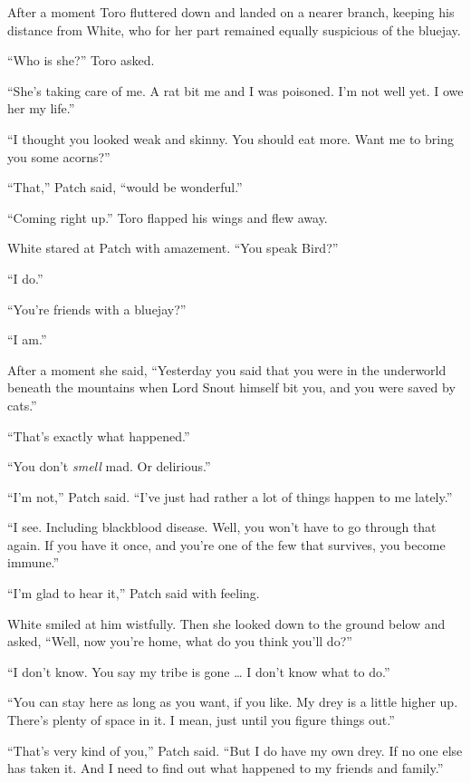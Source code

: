 \documentclass[ebook,oneside,openany,17pt]{memoir}
\newenvironment{tolerant}[1]{%
  \par\tolerance=#1\relax
}{%
  \par
}
\begin{document}
After a moment Toro fluttered down and landed on a nearer branch,
keeping his distance from White, who for her part remained equally
suspicious of the bluejay.

“Who is she?” Toro asked.

“She’s taking care of me. A rat bit me and I was poisoned. I’m not
well yet. I owe her my life.”

\begin{tolerant}{1000}
“I thought you looked weak and skinny. You should eat more. Want me to
bring you some acorns?”
\end{tolerant}

“That,” Patch said, “would be wonderful.”

“Coming right up.” Toro flapped his wings and flew away.

\begin{tolerant}{1000}
White stared at Patch with amazement. “You speak Bird?”
\end{tolerant}

“I do.”

“You’re friends with a bluejay?”

“I am.”

After a moment she said, “Yesterday you said that you were in the
underworld beneath the mountains when Lord Snout himself bit you, and
you were saved by cats.”

“That’s exactly what happened.”

“You don’t \emph{smell} mad. Or delirious.”

“I’m not,” Patch said. “I’ve just had rather a lot of things happen to
me lately.”

“I see. Including blackblood disease. Well, you won’t have to go
through that again. If you have it once, and you’re one of the few
that survives, you become immune.”

“I’m glad to hear it,” Patch said with feeling.

White smiled at him wistfully. Then she looked down to the ground
below and asked, “Well, now you’re home, what do you think you’ll do?”

“I don’t know. You say my tribe is gone … I don’t know what to do.”

“You can stay here as long as you want, if you like. My drey is a
little higher up. There’s plenty of space in it. I mean, just until
you figure things out.”

“That’s very kind of you,” Patch said. “But I do have my own drey. If
no one else has taken it. And I need to find out what happened to my
friends and family.”
\end{document}
